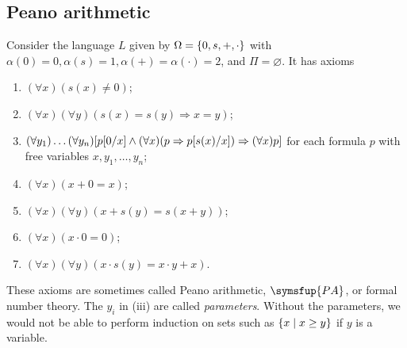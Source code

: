 \subsection{Peano arithmetic}
Consider the language \( L \) given by \( \Omega = \qty{0, s, +, \cdot} \) with \( \alpha(0) = 0, \alpha(s) = 1, \alpha(+) = \alpha(\cdot) = 2 \), and \( \Pi = \varnothing \).
It has axioms
\begin{enumerate}
    \item \( (\forall x)(s(x) \neq 0) \);
    \item \( (\forall x)(\forall y)(s(x) = s(y) \Rightarrow x = y) \);
    \item \( (\forall y_1)\dots(\forall y_n)\qty[p[0/x] \wedge (\forall x)(p \Rightarrow p[s(x)/x]) \Rightarrow (\forall x)p] \) for each formula \( p \) with free variables \( x, y_1, \dots, y_n \);
    \item \( (\forall x)(x + 0 = x) \);
    \item \( (\forall x)(\forall y)(x + s(y) = s(x + y)) \);
    \item \( (\forall x)(x \cdot 0 = 0) \);
    \item \( (\forall x)(\forall y)(x \cdot s(y) = x \cdot y + x) \).
\end{enumerate}
These axioms are sometimes called Peano arithmetic, \( \symsfup{PA} \), or formal number theory.
The \( y_i \) in (iii) are called \emph{parameters}.
Without the parameters, we would not be able to perform induction on sets such as \( \qty{x \mid x \geq y} \) if \( y \) is a variable.

